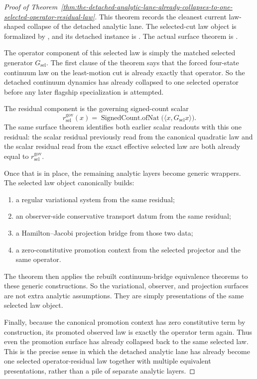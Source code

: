 \begin{proof}[Proof of Theorem~\ref{thm:the-detached-analytic-lane-already-collapses-to-one-selected-operator-residual-law}]
\label{proof:thm:the-detached-analytic-lane-already-collapses-to-one-selected-operator-residual-law}
This theorem records the cleanest current law-shaped collapse of the detached
analytic lane. The selected-cut law object is formalized by
, and its detached instance is
. The actual
surface theorem is
.

The operator component of this selected law is simply the matched selected
generator \(G_{\mathrm{sel}}\). The first clause of the theorem says that the
forced four-state continuum law on the least-motion cut is already exactly
that operator. So the detached continuum dynamics has already collapsed to one
selected operator before any later flagship specialization is attempted.

The residual component is the governing signed-count scalar
\[
r^{\mathrm{gov}}_{\mathrm{sel}}(x)=
\operatorname{SignedCount.ofNat}\!\bigl(\langle x,G_{\mathrm{sel}}x\rangle\bigr).
\]
The same surface theorem identifies both earlier scalar readouts with this one
residual: the scalar residual previously read from the canonical quadratic law
and the scalar residual read from the exact effective selected law are both
already equal to \(r^{\mathrm{gov}}_{\mathrm{sel}}\).

Once that is in place, the remaining analytic layers become generic wrappers.
The selected law object canonically builds:
\begin{enumerate}
\item a regular variational system from the same residual;
\item an observer-side conservative transport datum from the same residual;
\item a Hamilton--Jacobi projection bridge from those two data;
\item a zero-constitutive promotion context from the selected projector and
      the same operator.
\end{enumerate}
The theorem then applies the rebuilt continuum-bridge equivalence theorems to these
generic constructions. So the variational, observer, and projection surfaces
are not extra analytic assumptions. They are simply presentations of the same
selected law object.

Finally, because the canonical promotion context has zero constitutive term by
construction, its promoted observed law is exactly the operator term again.
Thus even the promotion surface has already collapsed back to the same
selected law. This is the precise sense in which the detached analytic lane
has already become one selected operator-residual law together with multiple
equivalent presentations, rather than a pile of separate analytic layers.
\end{proof}

